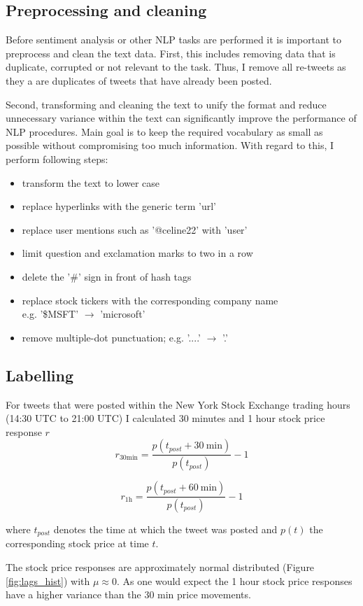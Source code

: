 \documentclass[a4paper,12pt]{article}%
\begin{document}
\subsection{Preprocessing and cleaning}
Before sentiment analysis or other NLP tasks are performed it is important to preprocess and clean the text data. First, this includes removing data that is duplicate, corrupted or not relevant to the task. Thus, I remove all re-tweets as they a are duplicates of tweets that have already been posted.

Second, transforming and cleaning the text to unify the format and reduce unnecessary variance within the text can significantly improve the performance of NLP procedures. Main goal is to keep the required vocabulary as small as possible without compromising too much information. With regard to this, I perform following steps:

\begin{itemize}
\item transform the text to lower case
\item replace hyperlinks with the generic term 'url'
\item replace user mentions such as '@celine22' with 'user'
\item limit question and exclamation marks to two in a row
\item delete the '\#' sign in front of hash tags
\item replace stock tickers with the corresponding company name \\ e.g. '\$MSFT' $\longrightarrow$ 'microsoft'
\item remove multiple-dot punctuation; e.g. '....' $\longrightarrow$ '.'
\end{itemize}


\subsection{Labelling \label{labelling}}
For tweets that were posted within the New York Stock Exchange trading hours (14:30 UTC to 21:00 UTC) I calculated 30 minutes and 1 hour stock price response $r$
$$
r_{30\text{min}} = \frac{p(t_{post} + 30~\text{min})}{p(t_{post})} - 1
$$

$$
r_{1 \text{h}} = \frac{p(t_{post} + 60~\text{min})}{p(t_{post})} - 1
$$

where $t_{post}$ denotes the time at which the tweet was posted and $p(t)$ the corresponding stock price at time $t$.

The stock price responses are approximately normal distributed (Figure \ref{fig:lags_hist}) with $\mu \approx 0$. As one would expect the 1 hour stock price responses have a higher variance than the 30 min price movements.\\
\end{document}
